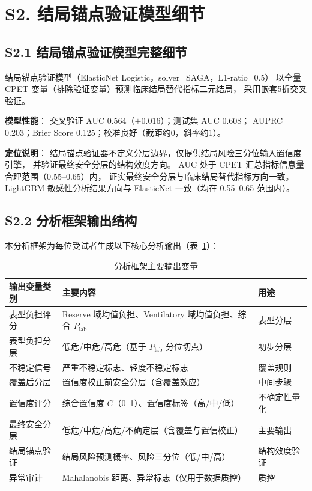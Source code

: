 \documentclass[12pt, a4paper]{ctexart}
\begin{document}
\clearpage

\section*{S2. 结局锚点验证模型细节}

\subsection*{S2.1 结局锚点验证模型完整细节}

结局锚点验证模型（ElasticNet Logistic，solver=SAGA，L1-ratio=0.5）
以全量 CPET 变量（排除验证变量）预测临床结局替代指标二元结局，
采用嵌套5折交叉验证。

\textbf{模型性能}：
交叉验证 AUC 0.564（$\pm$0.016）；测试集 AUC 0.608；
AUPRC 0.203；Brier Score 0.125；校准良好（截距约0，斜率约1）。

\textbf{定位说明}：
结局锚点验证器不定义分层边界，仅提供结局风险三分位输入置信度引擎，
并验证最终安全分层的结构效度方向。
AUC 处于 CPET 汇总指标信息量合理范围（0.55--0.65）内，
证实最终安全分层与临床结局替代指标方向一致。
LightGBM 敏感性分析结果方向与 ElasticNet 一致（均在 0.55--0.65 范围内）。

\subsection*{S2.2 分析框架输出结构}

本分析框架为每位受试者生成以下核心分析输出（表~\ref{tab:s5_output_summary}）：

\begin{table}[htbp]
\centering
\small
\caption{分析框架主要输出变量}
\label{tab:s5_output_summary}
\begin{tabular}{lll}
\toprule
输出变量类别 & 主要内容 & 用途 \\
\midrule
表型负担评分 & Reserve 域均值负担、Ventilatory 域均值负担、综合 $P_{\text{lab}}$ & 表型分层 \\
表型负担分层 & 低危/中危/高危（基于 $P_{\text{lab}}$ 分位切点） & 初步分层 \\
不稳定信号 & 严重不稳定标志、轻度不稳定标志 & 覆盖规则 \\
覆盖后分层 & 置信度校正前安全分层（含覆盖效应） & 中间步骤 \\
置信度评分 & 综合置信度 $C$（0--1）、置信度标签（高/中/低） & 不确定性量化 \\
最终安全分层 & 低危/中危/高危/不确定层（含覆盖与置信校正） & 主要输出 \\
结局锚点验证 & 结局风险预测概率、风险三分位（低/中/高）& 结构效度验证 \\
异常审计 & Mahalanobis 距离、异常标志（仅用于数据质控）& 质控 \\
\bottomrule
\end{tabular}
\end{table}
\end{document}

